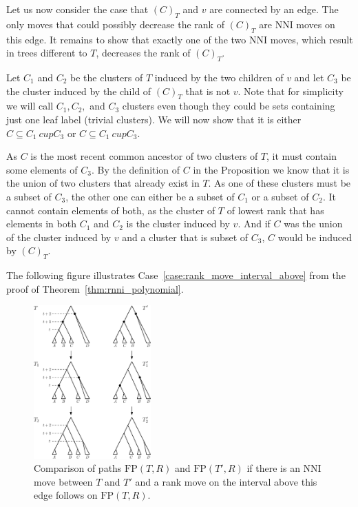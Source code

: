 \documentclass[11pt]{amsart}
\newcommand{\nni}{\mathrm{NNI}}
\newcommand{\fp}{\mathrm{FP}}
\begin{document}
Let us now consider the case that $(C)_T$ and $v$ are connected by an edge.
The only moves that could possibly decrease the rank of $(C)_T$ are $\nni$ moves on this edge.
It remains to show that exactly one of the two $\nni$ moves, which result in trees different to $T$, decreases the rank of $(C)_T$.

Let $C_1$ and $C_2$ be the clusters of $T$ induced by the two children of $v$ and let $C_3$ be the cluster induced by the child of $(C)_T$ that is not $v$.
Note that for simplicity we will call $C_1, C_2,$ and $C_3$ clusters even though they could be sets containing just one leaf label (trivial clusters).
We will now show that it is either $C \subseteq C_1 \ cup C_3$ or $C \subseteq C_1 \ cup C_3$.

As $C$ is the most recent common ancestor of two clusters of $T$, it must contain some elements of $C_3$.
By the definition of $C$ in the Proposition we know that it is the union of two clusters that already exist in $T$.
As one of these clusters must be a subset of $C_3$, the other one can either be a subset of $C_1$ or a subset of $C_2$.
It cannot contain elements of both, as the cluster of $T$ of lowest rank that has elements in both $C_1$ and $C_2$ is the cluster induced by $v$.
And if $C$ was the union of the cluster induced by $v$ and a cluster that is subset of $C_3$, $C$ would be induced by $(C)_T$.
\endproof

The following figure illustrates Case~\ref{case:rank_move_interval_above} from the proof of Theorem~\ref{thm:rnni_polynomial}.

\begin{figure}[ht]
	\centering
	\includegraphics[width=0.4\textwidth]{thm_fp_nni3}
	\caption{Comparison of paths $\fp(T, R)$ and $\fp(T', R)$ if there is an $\nni$ move between $T$ and $T'$ and a rank move on the interval above this edge follows on $\fp(T, R)$.}
	\label{fig:thm_fp_nni3}
\end{figure}

\newpage
\printbibliography
\end{document}
